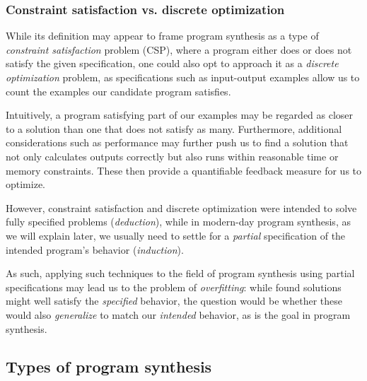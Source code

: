 \documentclass{article}
\begin{document}
\subsubsection{Constraint satisfaction vs. discrete optimization}

While its definition may appear to frame program synthesis as a type of \emph{constraint satisfaction} problem (CSP),
where a program either does or does not satisfy the given specification,
one could also opt to approach it as a \emph{discrete optimization} problem,
as specifications such as input-output examples allow us to count the examples our candidate program satisfies.

Intuitively, a program satisfying part of our examples may be regarded as closer to a solution than one that does not satisfy as many.
Furthermore, additional considerations such as performance may further push us to find a solution that not only calculates outputs correctly but also runs within reasonable time or memory constraints.
These then provide a quantifiable feedback measure for us to optimize.

However, constraint satisfaction and discrete optimization were intended to solve fully specified problems (\emph{deduction}),
while in modern-day program synthesis, as we will explain later,
we usually need to settle for a \emph{partial} specification of the intended program's behavior (\emph{induction}).

As such, applying such techniques to the field of program synthesis using partial specifications may lead us to the problem of \emph{overfitting}:
while found solutions might well satisfy the \emph{specified} behavior,
the question would be whether these would also \emph{generalize} to match our \emph{intended} behavior,
as is the goal in program synthesis.

\subsection{Types of program synthesis} \label{sec:synthtypes}
\end{document}

